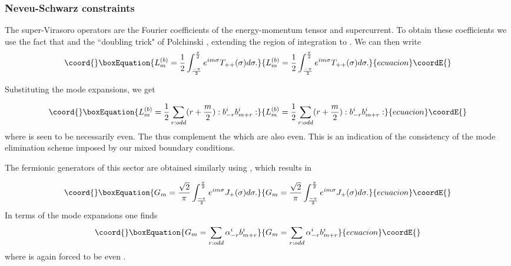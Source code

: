 \documentclass[a4paper,a4paper]{article}
\begin{document}
\subsubsection{Neveu-Schwarz constraints}

The super-Virasoro operators are the Fourier coefficients of the
energy-momentum tensor and supercurrent. To obtain these
coefficients we use the fact that \coordHE{}
and the ``doubling trick" of Polchinski \cite{Pol}, extending the
region of integration to \coordHE{}.  We can
then write
\begin{equation}\coord{}\boxEquation{
L_{m}^{(b)}=\frac{1}{2}\int_{\frac{-\pi}{2}}^{\frac{\pi}{2}}e^{im\sigma}
T_{++}(\sigma)d\sigma.
}{
L_{m}^{(b)}=\frac{1}{2}\int_{\frac{-\pi}{2}}^{\frac{\pi}{2}}e^{im\sigma}
T_{++}(\sigma)d\sigma.
}{ecuacion}\coordE{}\end{equation}

Substituting the mode expansions, we get

\begin{equation}\coord{}\boxEquation{
L_{m}^{(b)}=\frac{1}{2}\sum_{r:odd}(r+\frac{m}{2}):b_{-r}^{i}b_{m+r}^{i}:
}{
L_{m}^{(b)}=\frac{1}{2}\sum_{r:odd}(r+\frac{m}{2}):b_{-r}^{i}b_{m+r}^{i}:
}{ecuacion}\coordE{}\end{equation}
where \coordHE{} is seen to be necessarily even.  The \coordHE{} thus
complement the \coordHE{} which are also even.  This is an
indication of the consistency of the mode elimination scheme
imposed by our mixed boundary conditions.

The fermionic generators of this sector are obtained similarly
using \coordHE{}, which results in

\begin{equation}\coord{}\boxEquation{
G_{m}=\frac{\sqrt{2}}{\pi}\int_{\frac{-\pi}{2}}^{\frac{\pi}{2}}e^{im\sigma}J_{+}(\sigma)d\sigma.
}{
G_{m}=\frac{\sqrt{2}}{\pi}\int_{\frac{-\pi}{2}}^{\frac{\pi}{2}}e^{im\sigma}J_{+}(\sigma)d\sigma.
}{ecuacion}\coordE{}\end{equation}
In terms of the mode expansions one finds
\begin{equation}\coord{}\boxEquation{
G_{m}=\sum_{r:odd}\alpha_{-r}^{i}b_{m+r}^{i}
}{
G_{m}=\sum_{r:odd}\alpha_{-r}^{i}b_{m+r}^{i}
}{ecuacion}\coordE{}\end{equation}
where \coordHE{} is again forced to be even .
\end{document}
